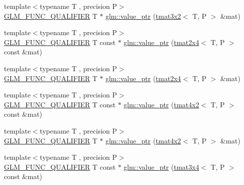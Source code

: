 \begin{DoxyCompactItemize}
\item 
{\footnotesize template$<$typename T , precision P$>$ }\\\mbox{\hyperlink{setup_8hpp_a33fdea6f91c5f834105f7415e2a64407}{G\+L\+M\+\_\+\+F\+U\+N\+C\+\_\+\+Q\+U\+A\+L\+I\+F\+I\+ER}} T $\ast$ \mbox{\hyperlink{group__gtc__type__ptr_gad6a737f57febdef255873f6a44d0db0e}{glm\+::value\+\_\+ptr}} (\mbox{\hyperlink{structglm_1_1tmat3x2}{tmat3x2}}$<$ T, P $>$ \&mat)
\item 
{\footnotesize template$<$typename T , precision P$>$ }\\\mbox{\hyperlink{setup_8hpp_a33fdea6f91c5f834105f7415e2a64407}{G\+L\+M\+\_\+\+F\+U\+N\+C\+\_\+\+Q\+U\+A\+L\+I\+F\+I\+ER}} T const  $\ast$ \mbox{\hyperlink{group__gtc__type__ptr_ga2336cd68e72b0d295c8cd33eb1588480}{glm\+::value\+\_\+ptr}} (\mbox{\hyperlink{structglm_1_1tmat2x4}{tmat2x4}}$<$ T, P $>$ const \&mat)
\item 
{\footnotesize template$<$typename T , precision P$>$ }\\\mbox{\hyperlink{setup_8hpp_a33fdea6f91c5f834105f7415e2a64407}{G\+L\+M\+\_\+\+F\+U\+N\+C\+\_\+\+Q\+U\+A\+L\+I\+F\+I\+ER}} T $\ast$ \mbox{\hyperlink{group__gtc__type__ptr_ga0d745a55255710933effd6391307f681}{glm\+::value\+\_\+ptr}} (\mbox{\hyperlink{structglm_1_1tmat2x4}{tmat2x4}}$<$ T, P $>$ \&mat)
\item 
{\footnotesize template$<$typename T , precision P$>$ }\\\mbox{\hyperlink{setup_8hpp_a33fdea6f91c5f834105f7415e2a64407}{G\+L\+M\+\_\+\+F\+U\+N\+C\+\_\+\+Q\+U\+A\+L\+I\+F\+I\+ER}} T const  $\ast$ \mbox{\hyperlink{group__gtc__type__ptr_ga1de002422f32c6da9d65d3f257f37196}{glm\+::value\+\_\+ptr}} (\mbox{\hyperlink{structglm_1_1tmat4x2}{tmat4x2}}$<$ T, P $>$ const \&mat)
\item 
{\footnotesize template$<$typename T , precision P$>$ }\\\mbox{\hyperlink{setup_8hpp_a33fdea6f91c5f834105f7415e2a64407}{G\+L\+M\+\_\+\+F\+U\+N\+C\+\_\+\+Q\+U\+A\+L\+I\+F\+I\+ER}} T $\ast$ \mbox{\hyperlink{group__gtc__type__ptr_ga0e62660f9066864568cd74d76d528a6e}{glm\+::value\+\_\+ptr}} (\mbox{\hyperlink{structglm_1_1tmat4x2}{tmat4x2}}$<$ T, P $>$ \&mat)
\item 
{\footnotesize template$<$typename T , precision P$>$ }\\\mbox{\hyperlink{setup_8hpp_a33fdea6f91c5f834105f7415e2a64407}{G\+L\+M\+\_\+\+F\+U\+N\+C\+\_\+\+Q\+U\+A\+L\+I\+F\+I\+ER}} T const  $\ast$ \mbox{\hyperlink{group__gtc__type__ptr_gacbf08ea2313cad8a42652d4455e69709}{glm\+::value\+\_\+ptr}} (\mbox{\hyperlink{structglm_1_1tmat3x4}{tmat3x4}}$<$ T, P $>$ const \&mat)

\end{DoxyCompactItemize}
